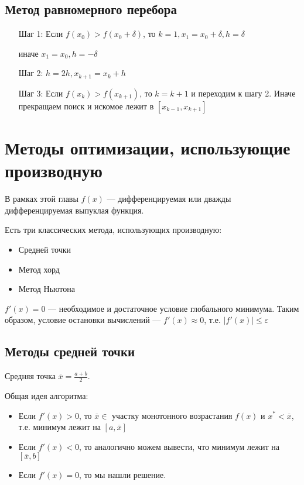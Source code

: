 \subsection{Метод равномерного перебора}

\begin{itemize}
    \item [Шаг 1:] Если \(f(x_0) > f(x_0 + \delta)\), то \(k = 1, x_1 = x_0 + \delta, h = \delta\)

          иначе \(x_1 = x_0, h = - \delta\)

    \item [Шаг 2:] \(h = 2h, x_{k+1} = x_k + h\)
    \item [Шаг 3:] Если \(f(x_k) > f(x_{k+1})\), то \(k = k + 1\) и переходим к шагу 2. Иначе прекращаем поиск и искомое лежит в \([x_{k - 1}, x_{k + 1}]\)
\end{itemize}

\section{Методы оптимизации, использующие производную}

В рамках этой главы \(f(x)\) --- дифференцируемая или дважды дифференцируемая выпуклая функция.

Есть три классических метода, использующих производную:
\begin{itemize}
    \item Средней точки
    \item Метод хорд
    \item Метод Ньютона
\end{itemize}

\(f'(x) = 0\) --- необходимое и достаточное условие глобального минимума. Таким образом, условие остановки вычислений --- \(f'(x) \approx 0\), т.е. \(|f'(x)| \leq \varepsilon\)

\subsection{Методы средней точки}

Средняя точка \(\overline x = \frac{a + b}{2}\).

Общая идея алгоритма:
\begin{itemize}
    \item Если \(f'(x) > 0\), то \(\overline x\in\) участку монотонного возрастания \(f(x)\) и \(x^* < \overline x\), т.е. минимум лежит на \([a, \overline x]\)
    \item Если \(f'(x) < 0\), то аналогично можем вывести, что минимум лежит на \([\overline x, b]\)
    \item Если \(f'(x) = 0\), то мы нашли решение.
\end{itemize}

